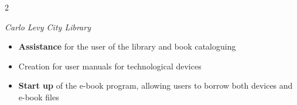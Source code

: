 \begin{cventries}
\begin{multicols}{2}
\begin{itemize}[leftmargin=*,nosep,label={}]
    \textit{Carlo Levy City Library}\\
    \begin{itemize}
        \item \textbf{Assistance} for the user of the library and book cataloguing\\
        \item Creation for user manuals for technological devices \\
        \item \textbf{Start up} of the e-book program, allowing users to borrow both devices and e-book files \\
    \end{itemize}
\end{itemize}
\end{multicols}

\end{cventries}